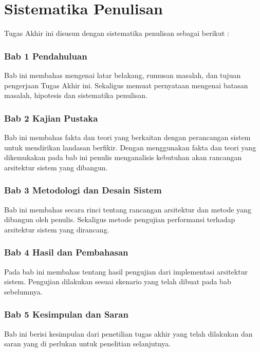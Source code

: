 \section{Sistematika Penulisan}
Tugas Akhir ini disusun dengan sistematika penulisan sebagai berikut :
\subsubsection{Bab 1 Pendahuluan}
Bab ini membahas mengenai latar belakang, rumusan masalah, dan tujuan pengerjaan Tugas Akhir ini. Sekaligus memuat pernyataan mengenai batasan masalah, hipotesis dan sistematika penulisan.
\subsubsection{Bab 2 Kajian Pustaka}
Bab ini membahas fakta dan teori yang berkaitan dengan perancangan sistem untuk mendirikan landasan berfikir. Dengan menggunakan fakta dan teori yang dikemukakan pada bab ini penulis menganalisis kebutuhan akan rancangan arsitektur sistem yang dibangun.
\subsubsection{Bab 3 Metodologi dan Desain Sistem}
Bab ini membahas secara rinci tentang rancangan arsitektur dan metode yang dibangun oleh penulis. Sekaligus metode pengujian performansi terhadap arsitektur sistem yang dirancang.
\subsubsection{Bab 4 Hasil dan Pembahasan}
Pada bab ini membahas tentang hasil pengujian dari implementasi arsitektur sistem. Pengujian dilakukan sesuai skenario yang telah dibuat pada bab sebelumnya.
\subsubsection{Bab 5 Kesimpulan dan Saran}
Bab ini berisi kesimpulan dari penetilian tugas akhir yang telah dilakukan dan saran yang di perlukan untuk penelitian selanjutnya.